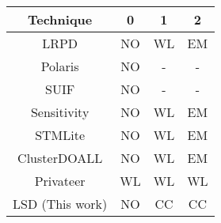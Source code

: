 \centering 
\begin{tabular}{c|c|c|c}
\hline 
Technique & 0 & 1  & 2 \\ \hline
LRPD \cite{rauchwerger:95:sigplan,dang:02:ipdps} & NO  & WL & EM \\ \hline
Polaris \cite{tu:94:lcpc,blume:96:icpp} & NO & - & -  \\ \hline
SUIF \cite{suif:94:stanford,hall:05:toplas} & NO  & - & - \\ \hline
Sensitivity \cite{Rus:07:ics} & NO  & WL & EM \\ \hline
STMLite \cite{mehrara:09:stmlite} & NO  & WL  & EM \\ \hline
ClusterDOALL \cite{kim:12:cgo} & NO & WL  & EM \\ \hline
Privateer \cite{johnson:12:pldi} & WL  & WL  & WL  \\ \hline
LSD (This work) & NO  & CC & CC \\ \hline
\end{tabular}
